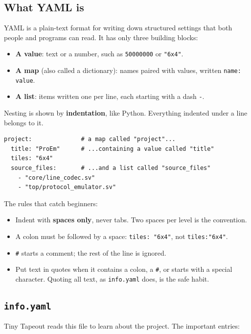 \documentclass[11pt,a4paper]{article}
\newcommand{\file}[1]{\texttt{#1}}
\begin{document}
\subsection{What YAML is}

YAML is a plain-text format for writing down structured settings that both people and programs can read. It has only three building blocks:

\begin{itemize}
\item \textbf{A value}: text or a number, such as \texttt{50000000} or \texttt{"6x4"}.
\item \textbf{A map} (also called a dictionary): names paired with values, written \texttt{name: value}.
\item \textbf{A list}: items written one per line, each starting with a dash \texttt{-}.
\end{itemize}

Nesting is shown by \textbf{indentation}, like Python. Everything indented under a line belongs to it.

\begin{lstlisting}
project:              # a map called "project"...
  title: "ProEm"      # ...containing a value called "title"
  tiles: "6x4"
  source_files:       # ...and a list called "source_files"
    - "core/line_codec.sv"
    - "top/protocol_emulator.sv"
\end{lstlisting}

The rules that catch beginners:
\begin{itemize}
\item Indent with \textbf{spaces only}, never tabs. Two spaces per level is the convention.
\item A colon must be followed by a space: \texttt{tiles: "6x4"}, not \texttt{tiles:"6x4"}.
\item \texttt{\#} starts a comment; the rest of the line is ignored.
\item Put text in quotes when it contains a colon, a \texttt{\#}, or starts with a special character. Quoting all text, as \file{info.yaml} does, is the safe habit.
\end{itemize}

\subsection{\file{info.yaml}}

Tiny Tapeout reads this file to learn about the project. The important entries:
\end{document}
